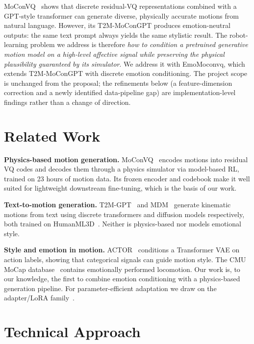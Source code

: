 \documentclass[conference]{IEEEtran}
\begin{document}
MoConVQ~\cite{yao2023moconvq} shows that discrete residual-VQ representations
combined with a GPT-style transformer can generate diverse, physically
accurate motions from natural language. However, its T2M-MoConGPT produces
emotion-neutral outputs: the same text prompt always yields the same stylistic
result. The robot-learning problem we address is therefore \emph{how to
condition a pretrained generative motion model on a high-level affective
signal while preserving the physical plausibility guaranteed by its simulator}.
We address it with EmoMoconvq, which extends T2M-MoConGPT with discrete
emotion conditioning. The project scope is unchanged from the proposal; the
refinements below (a feature-dimension correction and a newly identified
data-pipeline gap) are implementation-level findings rather than a change of
direction.

\section{Related Work}
\textbf{Physics-based motion generation.}
MoConVQ~\cite{yao2023moconvq} encodes motions into residual VQ codes and
decodes them through a physics simulator via model-based RL, trained on 23
hours of motion data. Its frozen encoder and codebook make it well suited for
lightweight downstream fine-tuning, which is the basis of our work.

\textbf{Text-to-motion generation.}
T2M-GPT~\cite{zhang2023t2m} and MDM~\cite{tevet2022human} generate kinematic
motions from text using discrete transformers and diffusion models
respectively, both trained on HumanML3D~\cite{guo2022generating}. Neither is
physics-based nor models emotional style.

\textbf{Style and emotion in motion.}
ACTOR~\cite{petrovich2021action} conditions a Transformer VAE on action
labels, showing that categorical signals can guide motion style. The CMU MoCap
database~\cite{cmu_mocap} contains emotionally performed locomotion. Our work
is, to our knowledge, the first to combine emotion conditioning with a
physics-based generation pipeline. For parameter-efficient adaptation we draw
on the adapter/LoRA family~\cite{hu2022lora}.

\section{Technical Approach}
\end{document}
